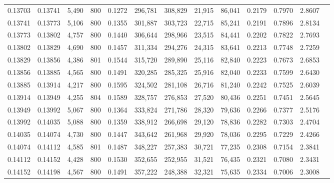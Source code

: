 \begin{tabular}{rrrrrrrrrrrrr}
0.13703 & 0.13741 &  5,490 &   800 &                                     0.1272 & 296,781 & 308,829 &  21,915 &  86,041 & 0.2179 & 0.7970 & 2.8607 \\
0.13741 & 0.13773 &  5,106 &   800 &                                     0.1355 & 301,887 & 303,723 &  22,715 &  85,241 & 0.2191 & 0.7896 & 2.8134 \\
0.13773 & 0.13802 &  4,757 &   800 &                                     0.1440 & 306,644 & 298,966 &  23,515 &  84,441 & 0.2202 & 0.7822 & 2.7693 \\
0.13802 & 0.13829 &  4,690 &   800 &                                     0.1457 & 311,334 & 294,276 &  24,315 &  83,641 & 0.2213 & 0.7748 & 2.7259 \\
0.13829 & 0.13856 &  4,386 &   801 &                                     0.1544 & 315,720 & 289,890 &  25,116 &  82,840 & 0.2223 & 0.7673 & 2.6853 \\
0.13856 & 0.13885 &  4,565 &   800 &                                     0.1491 & 320,285 & 285,325 &  25,916 &  82,040 & 0.2233 & 0.7599 & 2.6430 \\
0.13885 & 0.13914 &  4,217 &   800 &                                     0.1595 & 324,502 & 281,108 &  26,716 &  81,240 & 0.2242 & 0.7525 & 2.6039 \\
0.13914 & 0.13949 &  4,255 &   804 &                                     0.1589 & 328,757 & 276,853 &  27,520 &  80,436 & 0.2251 & 0.7451 & 2.5645 \\
0.13949 & 0.13992 &  5,067 &   800 &                                     0.1364 & 333,824 & 271,786 &  28,320 &  79,636 & 0.2266 & 0.7377 & 2.5176 \\
0.13992 & 0.14035 &  5,088 &   800 &                                     0.1359 & 338,912 & 266,698 &  29,120 &  78,836 & 0.2282 & 0.7303 & 2.4704 \\
0.14035 & 0.14074 &  4,730 &   800 &                                     0.1447 & 343,642 & 261,968 &  29,920 &  78,036 & 0.2295 & 0.7229 & 2.4266 \\
0.14074 & 0.14112 &  4,585 &   801 &                                     0.1487 & 348,227 & 257,383 &  30,721 &  77,235 & 0.2308 & 0.7154 & 2.3841 \\
0.14112 & 0.14152 &  4,428 &   800 &                                     0.1530 & 352,655 & 252,955 &  31,521 &  76,435 & 0.2321 & 0.7080 & 2.3431 \\
0.14152 & 0.14198 &  4,567 &   800 &                                     0.1491 & 357,222 & 248,388 &  32,321 &  75,635 & 0.2334 & 0.7006 & 2.3008 \\

\end{tabular}
